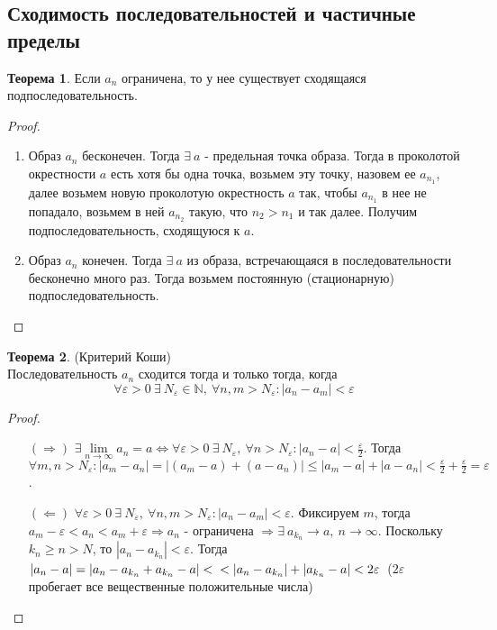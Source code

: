 \documentclass[a4paper, 12pt]{article}
\newcommand{\N}{\mathbb{N}}
\renewcommand{\epsilon}{\varepsilon}
\newcommand\tab[1][.5cm]{\hspace*{#1}}
\newcommand{\lims}{\lim\limits_{n\to \infty}}
\theoremstyle{definition}
\newtheorem*{theorem}{Теорема}
\begin{document}
    \subsection{Сходимость последовательностей и частичные пределы}
        \begin{theorem}
            Если $a_n$ ограничена, то у нее существует сходящаяся подпоследовательность. 
        \end{theorem}
        \begin{proof}\tab
            \begin{enumerate}
                \item Образ $a_n$ бесконечен. Тогда $\exists\ a$ - предельная точка образа. Тогда в проколотой окрестности $a$ есть хотя бы одна точка, возьмем эту точку, назовем ее $a_{n_1}$, далее возьмем новую проколотую окрестность $a$ так, чтобы $a_{n_1}$ в нее не попадало, возьмем в ней $a_{n_2}$ такую, что $n_2>n_1$ и так далее. Получим подпоследовательность, сходящуюся к $a$. 
                \item Образ $a_n$ конечен. Тогда $\exists\ a$ из образа, встречающаяся в последовательности бесконечно много раз. Тогда возьмем постоянную (стационарную) подпоследовательность.
            \end{enumerate}
        \end{proof} 
        \begin{theorem} (Критерий Коши)\\
            Последовательность $a_n$ сходится тогда и только тогда, когда
            \[\forall \epsilon>0\ \exists\ N_{\epsilon}\in \N,\ \forall n,m>N_{\epsilon}: |a_n-a_m|<\epsilon\]
        \end{theorem} 
        \begin{proof}\tab
            \begin{itemize}
                \item[$(\Rightarrow)$] $\exists \lims a_n =a \Leftrightarrow \forall \epsilon>0\ \exists\ N_{\epsilon},\ \forall n>N_{\epsilon}: |a_n-a|<\frac{\epsilon}{2}$. Тогда $\forall m,n>N_{\epsilon}: |a_m-a_n|=|(a_m-a)+(a-a_n)|\leq |a_m-a|+|a-a_n|<\frac{\epsilon}{2}+\frac{\epsilon}{2}=\epsilon$. 
                \item[$(\Leftarrow)$] $\forall \epsilon>0\ \exists\ N_{\epsilon},\ \forall n,m>N_{\epsilon}: |a_n-a_m|<\epsilon$. Фиксируем $m$, тогда\\ $a_m-\epsilon<a_n<a_m+\epsilon \Rightarrow a_n$ - ограничена $\Rightarrow \exists\ a_{k_n}\to a,\ n\to \infty$. Поскольку $k_n\geq n > N$, то $|a_n-a_{k_n}|<\epsilon$. Тогда $|a_n-a|=|a_n-a_{k_n}+a_{k_n}-a|<\\<|a_n-a_{k_n}|+|a_{k_n}-a|<2\epsilon$\ ($2\epsilon$ пробегает все вещественные положительные числа) 
            \end{itemize}
        \end{proof} 
\end{document}
